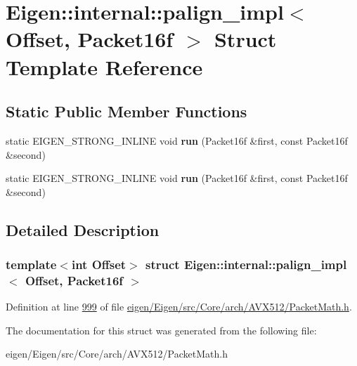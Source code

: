 \hypertarget{struct_eigen_1_1internal_1_1palign__impl_3_01_offset_00_01_packet16f_01_4}{}\section{Eigen\+:\+:internal\+:\+:palign\+\_\+impl$<$ Offset, Packet16f $>$ Struct Template Reference}
\label{struct_eigen_1_1internal_1_1palign__impl_3_01_offset_00_01_packet16f_01_4}
\subsection*{Static Public Member Functions}
\begin{DoxyCompactItemize}
\item 
\mbox{\label{struct_eigen_1_1internal_1_1palign__impl_3_01_offset_00_01_packet16f_01_4_abc1d0f94deb62c40d884c3293a0dbc18}} 
static E\+I\+G\+E\+N\+\_\+\+S\+T\+R\+O\+N\+G\+\_\+\+I\+N\+L\+I\+NE void {\bfseries run} (Packet16f \&first, const Packet16f \&second)
\item 
\mbox{\label{struct_eigen_1_1internal_1_1palign__impl_3_01_offset_00_01_packet16f_01_4_abc1d0f94deb62c40d884c3293a0dbc18}} 
static E\+I\+G\+E\+N\+\_\+\+S\+T\+R\+O\+N\+G\+\_\+\+I\+N\+L\+I\+NE void {\bfseries run} (Packet16f \&first, const Packet16f \&second)
\end{DoxyCompactItemize}


\subsection{Detailed Description}
\subsubsection*{template$<$int Offset$>$\newline
struct Eigen\+::internal\+::palign\+\_\+impl$<$ Offset, Packet16f $>$}



Definition at line \hyperlink{eigen_2_eigen_2src_2_core_2arch_2_a_v_x512_2_packet_math_8h_source_l00999}{999} of file \hyperlink{eigen_2_eigen_2src_2_core_2arch_2_a_v_x512_2_packet_math_8h_source}{eigen/\+Eigen/src/\+Core/arch/\+A\+V\+X512/\+Packet\+Math.\+h}.



The documentation for this struct was generated from the following file\+:\begin{DoxyCompactItemize}
\item 
eigen/\+Eigen/src/\+Core/arch/\+A\+V\+X512/\+Packet\+Math.\+h\end{DoxyCompactItemize}
